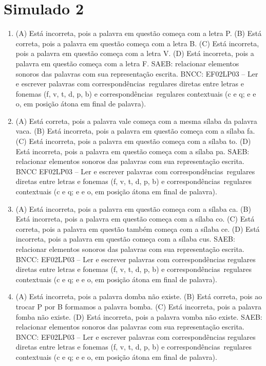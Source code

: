 \section*{Simulado 2}

\begin{enumerate}
\item
(A) Está incorreta, pois a palavra em questão começa com a letra P.
(B) Está correta, pois a palavra em questão começa com a letra B.
(C) Está incorreta, pois a palavra em questão começa com a letra V.
(D) Está incorreta, pois a palavra em questão começa com a letra F.
SAEB: relacionar elementos sonoros das palavras com sua representação escrita.
BNCC: EF02LP03 -- Ler e escrever palavras com correspondências~regulares
diretas entre letras e fonemas (f, v, t, d, p, b) e correspondências~regulares contextuais (c e q; e e o, em posição átona em final de palavra).

\item
(A) Está correta, pois a palavra vale começa com a mesma sílaba da palavra vaca.
(B) Está incorreta, pois a palavra em questão começa com a sílaba fa.
(C) Está incorreta, pois a palavra em questão começa com a sílaba to.
(D) Está incorreta, pois a palavra em questão começa com a sílaba pa.
SAEB: relacionar elementos sonoros das palavras com sua representação escrita.
BNCC EF02LP03 -- Ler e escrever palavras com correspondências~regulares
diretas entre letras e fonemas (f, v, t, d, p, b) e correspondências~regulares contextuais (c e q; e e o, em posição átona em final de palavra).

\item
(A) Está incorreta, pois a palavra em questão começa com a sílaba ca.
(B) Está incorreta, pois a palavra em questão começa com a sílaba co.
(C) Está correta, pois a palavra em questão também começa com a sílaba ce.
(D) Está incorreta, pois a palavra em questão começa com a sílaba cus.
SAEB: relacionar elementos sonoros das palavras com sua representação escrita.
BNCC: EF02LP03 -- Ler e escrever palavras com correspondências
regulares diretas entre letras e fonemas (f, v, t, d, p, b) e
correspondências~regulares contextuais (c e q; e e o, em posição átona
em final de palavra).

\item
(A) Está incorreta, pois a palavra domba não existe.
(B) Está correta, pois ao trocar P por B formamos a palavra bomba.
(C) Está incorreta, pois a palavra fomba não existe.
(D) Está incorreta, pois a palavra vomba não existe.
SAEB: relacionar elementos sonoros das palavras com sua representação escrita.
BNCC: EF02LP03 -- Ler e escrever palavras com correspondências
regulares diretas entre letras e fonemas (f, v, t, d, p, b) e
correspondências~regulares contextuais (c e q; e e o, em posição átona
em final de palavra).


\end{enumerate}
